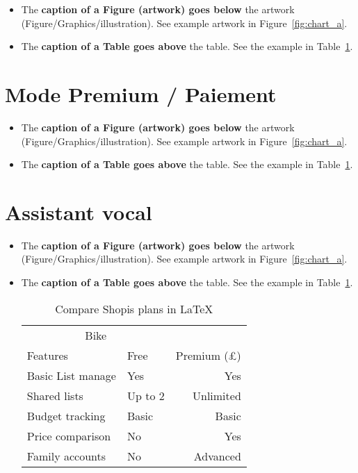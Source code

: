 \begin{itemize}
    \item The \textbf{caption of a Figure (artwork) goes below} the artwork (Figure/Graphics/illustration). See example artwork in Figure~\ref{fig:chart_a}. 
    \item  The \textbf{caption of a Table goes above} the table. See the example in Table~\ref{tab:_ex_tab}. 
\end{itemize}



\section{Mode Premium / Paiement}

\begin{itemize}
    \item The \textbf{caption of a Figure (artwork) goes below} the artwork (Figure/Graphics/illustration). See example artwork in Figure~\ref{fig:chart_a}. 
    \item  The \textbf{caption of a Table goes above} the table. See the example in Table~\ref{tab:_ex_tab}. 
\end{itemize}




\section{Assistant vocal}

\begin{itemize}
    \item The \textbf{caption of a Figure (artwork) goes below} the artwork (Figure/Graphics/illustration). See example artwork in Figure~\ref{fig:chart_a}. 
    \item  The \textbf{caption of a Table goes above} the table. See the example in Table~\ref{tab:_ex_tab}. 
    \begin{table}[h!]
    \centering
    \caption{Compare Shopis plans in \LaTeX}
    \label{tab:_ex_tab}
    \begin{tabular}{llr}     
        \toprule
        \multicolumn{2}{c}{Bike} \\
        \cmidrule(r){1-3}
        Features            & Free    & Premium  (\pounds) \\
        \midrule
        Basic List manage   & Yes      & Yes   \\
        Shared lists        & Up to 2  & Unlimited   \\
        Budget tracking     & Basic    & Basic   \\
        Price comparison    & No       & Yes   \\
        Family accounts     & No       & Advanced   \\
        \bottomrule
    \end{tabular}
\end{table}
\end{itemize}
